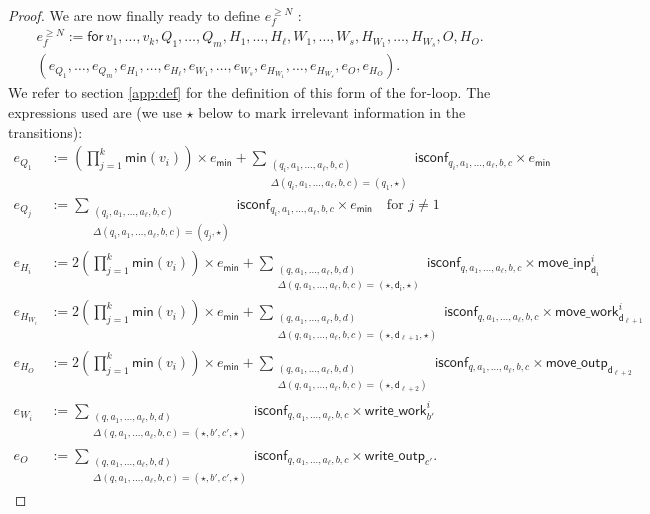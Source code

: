 \begin{proof}
We are now finally ready to define $e_f^{\geq N}$ :
\begin{multline*}
e_f^{\geq N}:= \mathsf{for\,} v_1,\ldots,v_{k},Q_1,\ldots,Q_m,H_1,\ldots,H_\ell,W_1,\ldots,W_s, H_{W_1},\ldots,H_{W_s},O,H_O . \\
(e_{Q_1},\ldots,e_{Q_m},e_{H_1},\ldots,e_{H_\ell},e_{W_1},\ldots,e_{W_s},e_{H_{W_1}},\ldots,e_{H_{W_s}},e_{O}, e_{H_O}).
\end{multline*}
We refer to section \ref{app:def} for the definition of this form of the for-loop. The expressions used are (we use $\star$ below to mark irrelevant information in the transitions):
 \allowdisplaybreaks
\begin{align*}
	e_{Q_1}&:=\left(\prod_{j=1}^{k} \textsf{min}(v_i)\right)\times e_{\mathsf{min}}
	+ \sum_{\substack{(q_i,a_1,\ldots,a_\ell,b,c)\\
	\Delta(q_i,a_1,\ldots,a_\ell,b,c)=(q_1,\star)}} \!\!\!\!\!\!\!\!\! \mathsf{isconf}_{q_i,a_1,\ldots,a_\ell,b,c}\times e_{\mathsf{min}} \\
	e_{Q_j}&:=\sum_{\substack{(q_i,a_1,\ldots,a_\ell,b,c)\\
	\Delta(q_i,a_1,\ldots,a_\ell,b,c)=(q_j,\star)}} \!\!\!\!\!\!\!\!\! \mathsf{isconf}_{q_i,a_1,\ldots,a_\ell,b,c}\times e_{\mathsf{min}}
	 \quad \text{for $j\neq 1$}\\
	e_{H_i}&:=2\left(\prod_{j=1}^{k} \textsf{min}(v_i)\right)\times e_{\mathsf{min}}
	+\sum_{\substack{(q,a_1,\ldots,a_\ell,b,d)\\
	\Delta(q,a_1,\ldots,a_\ell,b,c)=(\star,\mathsf{d_i},\star)}}\!\!\!\!\!\!\!\!\! \mathsf{isconf}_{q,a_1,\ldots,a_\ell,b,c}\times\mathsf{move\_inp}^i_{\mathsf{d}_i}\\
	e_{H_{W_i}}&:=2\left(\prod_{j=1}^{k} \textsf{min}(v_i)\right)\times e_{\mathsf{min}}
	+\sum_{\substack{(q,a_1,\ldots,a_\ell,b,d)\\
	\Delta(q,a_1,\ldots,a_\ell,b,c)=(\star,\mathsf{d_{\ell+1}},\star)}}\!\!\!\!\!\!\!\!\! \mathsf{isconf}_{q,a_1,\ldots,a_\ell,b,c}\times\mathsf{move\_work}_{\mathsf{d}_{\ell+1}}^i\\
	e_{H_O}&:=2\left(\prod_{j=1}^{k} \textsf{min}(v_i)\right)\times e_{\mathsf{min}}
	+\sum_{\substack{(q,a_1,\ldots,a_\ell,b,d)\\
	\Delta(q,a_1,\ldots,a_\ell,b,c)=(\star,\mathsf{d}_{\ell+2})}}\!\!\!\!\!\!\!\!\! \mathsf{isconf}_{q,a_1,\ldots,a_\ell,b,c}\times\mathsf{move\_outp}_{\mathsf{d}_{\ell+2}}\\
	e_{W_i}&:=\sum_{\substack{(q,a_1,\ldots,a_\ell,b,d)\\
	\Delta(q,a_1,\ldots,a_\ell,b,c)=(\star,b',c',\star)}}\!\!\!\!\!\!\!\!\! \mathsf{isconf}_{q,a_1,\ldots,a_\ell,b,c}\times\mathsf{write\_work}_{b'}^i\\
	e_{O}&:=\sum_{\substack{(q,a_1,\ldots,a_\ell,b,d)\\
	\Delta(q,a_1,\ldots,a_\ell,b,c)=(\star,b',c',\star)}}\!\!\!\!\!\!\!\!\! \mathsf{isconf}_{q,a_1,\ldots,a_\ell,b,c}\times\mathsf{write\_outp}_{c'}.
\end{align*}


\end{proof}
